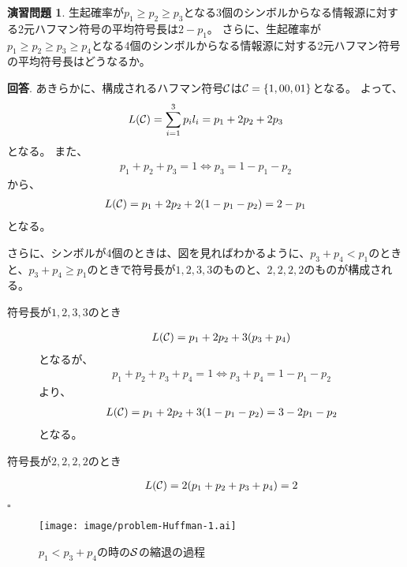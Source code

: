 \documentclass[pdflatex, ja=standard, a4paper]{bxjsarticle}
\theoremstyle{definition}
\newtheorem{problem}{演習問題}
\newenvironment{answer}{\noindent\textbf{回答}.}{\hfill$\square$}
\begin{document}
\begin{problem}
    生起確率が$p_1 \geq p_2 \geq p_3$となる3個のシンボルからなる情報源に対する2元ハフマン符号の平均符号長は$2 - p_1$。
    さらに、生起確率が$p_1 \geq p_2 \geq p_3 \geq p_4$となる4個のシンボルからなる情報源に対する2元ハフマン符号の平均符号長はどうなるか。
\end{problem}
\begin{answer}
    あきらかに、構成されるハフマン符号$\mathcal{C}$は$\mathcal{C} = \{1, 00, 01\}$となる。
    よって、
    \begin{align*}
        L(\mathcal{C}) = \sum_{i = 1}^3 p_i l_i = p_1 + 2 p_2 + 2 p_3
    \end{align*}
    となる。
    また、
    \begin{align*}
        p_1 + p_2 + p_3 = 1 \iff p_3 = 1 - p_1 - p_2
    \end{align*}
    から、
    \begin{align*}
        L(\mathcal{C}) = p_1 + 2 p_2 + 2 (1 - p_1 - p_2) = 2 - p_1
    \end{align*}
    となる。

    さらに、シンボルが4個のときは、図を見ればわかるように、$p_3 + p_4 < p_1$のときと、$p_3 + p_4 \geq p_1$のときで符号長が$1, 2, 3, 3$のものと、$2, 2, 2, 2$のものが構成される。
    \begin{description}
        \item[符号長が$1, 2, 3, 3$のとき]
            \begin{align*}
                L(\mathcal{C}) = p_1 + 2 p_2 + 3(p_3 + p_4)
            \end{align*}
            となるが、
            \begin{align*}
                p_1 + p_2 + p_3 + p_4 = 1 \iff p_3 + p_4 = 1 - p_1 - p_2
            \end{align*}
            より、
            \begin{align*}
                L(\mathcal{C}) = p_1 + 2 p_2 + 3 (1 - p_1 - p_2) = 3 - 2 p_1 - p_2
            \end{align*}
            となる。
        \item[符号長が$2, 2, 2, 2$のとき]
            \begin{align*}
                L(\mathcal{C}) = 2 (p_1 + p_2 + p_3 + p_4) = 2
            \end{align*}
    \end{description}
\end{answer}
\begin{figure}
    \centering
    \texttt{[image: image/problem-Huffman-1.ai]}
    \caption{$p_1 < p_3 + p_4$の時の$\mathcal{S}$の縮退の過程}
\end{figure}
\end{document}
